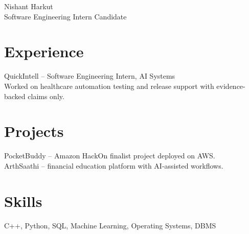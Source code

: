 \documentclass[10pt]{article}
\begin{document}
{\Large Nishant Harkut}\\
Software Engineering Intern Candidate\\

\section*{Experience}
QuickIntell -- Software Engineering Intern, AI Systems\\
Worked on healthcare automation testing and release support with evidence-backed claims only.\\

\section*{Projects}
PocketBuddy -- Amazon HackOn finalist project deployed on AWS.\\
ArthSaathi -- financial education platform with AI-assisted workflows.\\

\section*{Skills}
C++, Python, SQL, Machine Learning, Operating Systems, DBMS
\end{document}
